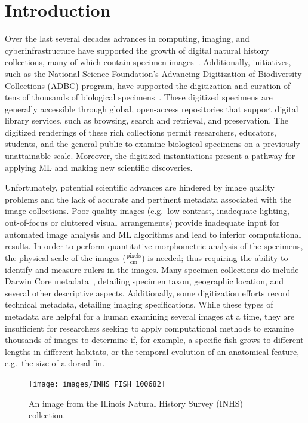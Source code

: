 \documentclass[conference]{IEEEtran}
\begin{document}
\section{Introduction}
Over the last several decades advances in computing, imaging, and cyberinfrastructure have supported the growth of digital natural history collections, many of which contain specimen images~\cite{beaman2012mass}. Additionally, initiatives, such as the National Science Foundation’s Advancing Digitization of Biodiversity Collections (ADBC) program,
have supported the digitization and curation of tens of thousands of biological specimens~\cite{page2015digitization}. These digitized specimens are generally accessible through global, open-access repositories that support digital library services, such as browsing, search and retrieval, and preservation. The digitized renderings of these rich collections permit researchers, educators, students, and the general public to examine biological specimens
on a previously unattainable scale. Moreover, the digitized instantiations present a pathway for applying ML and making new scientific discoveries. 

Unfortunately, potential scientific advances are hindered by image quality
problems and the lack of accurate and pertinent metadata
associated with the image collections.
Poor quality images (e.g.\ low contrast, inadequate lighting,
out-of-focus or cluttered visual arrangements) provide inadequate input
for automated
image analysis and ML algorithms and lead to inferior
computational results.
In order to perform quantitative morphometric analysis of the specimens,
the physical scale of the images (\(\frac{\mathrm{pixels}}{\mathrm{cm}}\)) is needed; thus
requiring the ability to identify and measure rulers in the images.
Many specimen collections do include Darwin Core metadata~\cite{biodiv_info_standards}, detailing
specimen taxon, geographic location, and several other descriptive aspects.
Additionally, some digitization efforts record technical metadata, detailing imaging specifications. While these types of metadata are helpful for a
human examining several images at a time, they are insufficient for researchers seeking to apply computational methods %
to examine thousands of images
to determine if, for example, a specific fish grows to different lengths
in different habitats, or the temporal evolution of an anatomical feature,
e.g.~the size of a dorsal fin.
\begin{figure}[t]
  \centering
  \texttt{[image: images/INHS\_FISH\_100682]}
  \caption{An image from the Illinois Natural History Survey (INHS) collection.}
  \label{fig:INHS_examples}
\end{figure}
\end{document}
